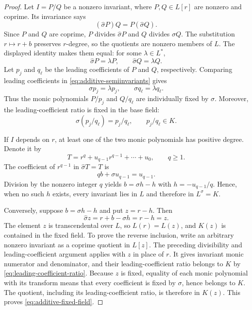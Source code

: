 \begin{proof}
Let $I=P/Q$ be a nonzero invariant, where $P,Q\in L[r]$ are nonzero and
coprime. Its invariance says
\[
 (\widehat\sigma P)Q=P(\widehat\sigma Q).
\]
Since $P$ and $Q$ are coprime, $P$ divides $\widehat\sigma P$ and $Q$
divides $\widehat\sigma Q$. The substitution $r\mapsto r+b$ preserves
$r$-degree, so the quotients are nonzero members of $L$. The displayed
identity makes them equal: for some $\lambda\in L^*$,
\begin{equation}
 \widehat\sigma P=\lambda P,\qquad
 \widehat\sigma Q=\lambda Q.
 \label{eq:additive-semiinvariants}
\end{equation}
Let $p_j$ and $q_\ell$ be the leading coefficients of $P$ and $Q$,
respectively. Comparing leading coefficients in
\eqref{eq:additive-semiinvariants} gives
\[
 \sigma p_j=\lambda p_j,\qquad
 \sigma q_\ell=\lambda q_\ell.
\]
Thus the monic polynomials $P/p_j$ and $Q/q_\ell$ are individually fixed by
$\widehat\sigma$. Moreover, the leading-coefficient ratio is fixed in
the base field:
\begin{equation}
 \sigma(p_j/q_\ell)=p_j/q_\ell,
 \qquad p_j/q_\ell\in K.
 \label{eq:leading-coefficient-ratio}
\end{equation}

If $I$ depends on $r$, at least one of the two monic polynomials has
positive degree. Denote it by
\[
 T=r^q+u_{q-1}r^{q-1}+\cdots+u_0,\qquad q\ge1.
\]
The coefficient of $r^{q-1}$ in $\widehat\sigma T=T$ is
\[
 qb+\sigma u_{q-1}=u_{q-1}.
\]
Division by the nonzero integer $q$ yields
$b=\sigma h-h$ with $h=-u_{q-1}/q$. Hence, when no such $h$ exists, every
invariant lies in $L$ and therefore in $L^\sigma=K$.

Conversely, suppose $b=\sigma h-h$ and put $z=r-h$. Then
\[
 \widehat\sigma z=r+b-\sigma h=r-h=z.
\]
The element $z$ is transcendental over $L$, so $L(r)=L(z)$, and $K(z)$ is
contained in the fixed field. To prove the reverse inclusion, write an
arbitrary nonzero invariant as a coprime quotient in $L[z]$. The preceding
divisibility and leading-coefficient argument applies with $z$ in place of
$r$. It gives invariant monic numerator and denominator, and their
leading-coefficient ratio belongs to $K$ by
\eqref{eq:leading-coefficient-ratio}. Because $z$ is fixed, equality of
each monic polynomial with its transform means that every coefficient is
fixed by $\sigma$, hence belongs to $K$. The quotient, including its
leading-coefficient ratio, is therefore in $K(z)$. This proves
\eqref{eq:additive-fixed-field}.
\end{proof}

